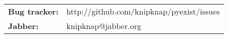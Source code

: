 \begin{tabular}{ll}
{\bf Bug tracker:}   & http://github.com/knipknap/pyexist/issues \\
{\bf Jabber:}        & knipknap@jabber.org
\end{tabular}

